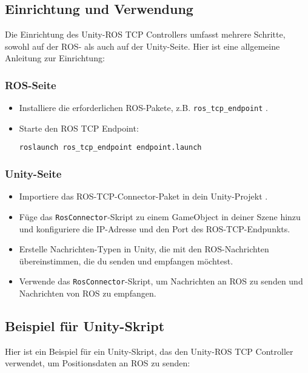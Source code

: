 \subsection{Einrichtung und Verwendung}

Die Einrichtung des Unity-ROS TCP Controllers umfasst mehrere Schritte, sowohl auf der ROS- als auch auf der Unity-Seite. Hier ist eine allgemeine Anleitung zur Einrichtung:

\subsubsection{ROS-Seite}

\begin{itemize}
    \item Installiere die erforderlichen ROS-Pakete, z.B. \texttt{ros\_tcp\_endpoint} \cite{ros_tcp_endpoint}.
    \item Starte den ROS TCP Endpoint:
    \begin{verbatim}
roslaunch ros_tcp_endpoint endpoint.launch
    \end{verbatim}
\end{itemize}

\subsubsection{Unity-Seite}

\begin{itemize}
    \item Importiere das ROS-TCP-Connector-Paket in dein Unity-Projekt \cite{unity_ros_tcp_connector}.
    \item Füge das \texttt{RosConnector}-Skript zu einem GameObject in deiner Szene hinzu und konfiguriere die IP-Adresse und den Port des ROS-TCP-Endpunkts.
    \item Erstelle Nachrichten-Typen in Unity, die mit den ROS-Nachrichten übereinstimmen, die du senden und empfangen möchtest.
    \item Verwende das \texttt{RosConnector}-Skript, um Nachrichten an ROS zu senden und Nachrichten von ROS zu empfangen.
\end{itemize}

\subsection{Beispiel für Unity-Skript}

Hier ist ein Beispiel für ein Unity-Skript, das den Unity-ROS TCP Controller verwendet, um Positionsdaten an ROS zu senden:


